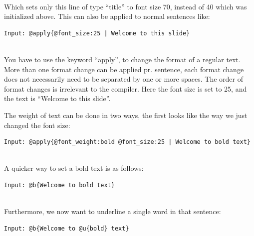  \\

Which sets only this line of type ``title'' to font size 70, instead of 40 which was initialized above.
This can also be applied to normal sentences like:\\

\begin{lstlisting}[frame=single]
Input: @apply{@font_size:25 | Welcome to this slide}
\end{lstlisting}

 \\

You have to use the keyword ``apply'', to change the format of a regular text. More than one format change can be applied pr. sentence, each format change does not necessarily need to be separated by one or more spaces. The order of format changes is irrelevant to the compiler. Here the font size is set to 25, and the text is ``Welcome to this slide''.

The weight of text can be done in two ways, the first looks like the way we just changed the font size:\\

\begin{lstlisting}[frame=single]
Input: @apply{@font_weight:bold @font_size:25 | Welcome to bold text}
\end{lstlisting}

 \\

A quicker way to set a bold text is as follows:\\

\begin{lstlisting}[frame=single]
Input: @b{Welcome to bold text}
\end{lstlisting}

 \\

Furthermore, we now want to underline a single word in that sentence:\\

\begin{lstlisting}[frame=single]
Input: @b{Welcome to @u{bold} text}
\end{lstlisting}

 \\


